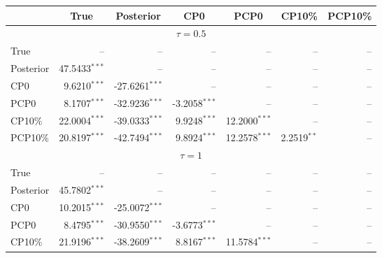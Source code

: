 { \renewcommand{\arraystretch}{1.2} 
 {\footnotesize 
\begin{table} 
\center 
\begin{tabular}{l | rrrrrr} 
& \multicolumn{1}{c}{True}& \multicolumn{1}{c}{Posterior}& \multicolumn{1}{c}{CP0}& \multicolumn{1}{c}{PCP0}& \multicolumn{1}{c}{CP10\%}& \multicolumn{1}{c}{PCP10\%} \\ \hline 
\multicolumn{7}{c}{$\tau = 0.5$} \\ \hline 
True &    --\phantom{$^{***}$} &    --\phantom{$^{***}$} &    --\phantom{$^{***}$} &    --\phantom{$^{***}$} &    --\phantom{$^{***}$} &    --\phantom{$^{***}$}   \\ 
Posterior & 47.5433$^{***}$ &    --\phantom{$^{***}$} &    --\phantom{$^{***}$} &    --\phantom{$^{***}$} &    --\phantom{$^{***}$} &    --\phantom{$^{***}$}   \\ 
CP0 & 9.6210$^{***}$ & -27.6261$^{***}$ &    --\phantom{$^{***}$} &    --\phantom{$^{***}$} &    --\phantom{$^{***}$} &    --\phantom{$^{***}$}   \\ 
PCP0 & 8.1707$^{***}$ & -32.9236$^{***}$ & -3.2058$^{***}$ &    --\phantom{$^{***}$} &    --\phantom{$^{***}$} &    --\phantom{$^{***}$}   \\ 
CP10\% & 22.0004$^{***}$ & -39.0333$^{***}$ & 9.9248$^{***}$ & 12.2000$^{***}$ &    --\phantom{$^{***}$} &    --\phantom{$^{***}$}   \\ 
PCP10\% & 20.8197$^{***}$ & -42.7494$^{***}$ & 9.8924$^{***}$ & 12.2578$^{***}$ & 2.2519$^{**}$\phantom{$^{*}$} &    --\phantom{$^{***}$}   \\ 
\hline 
\multicolumn{7}{c}{$\tau = 1$} \\ \hline 
True &    --\phantom{$^{***}$} &    --\phantom{$^{***}$} &    --\phantom{$^{***}$} &    --\phantom{$^{***}$} &    --\phantom{$^{***}$} &    --\phantom{$^{***}$}   \\ 
Posterior & 45.7802$^{***}$ &    --\phantom{$^{***}$} &    --\phantom{$^{***}$} &    --\phantom{$^{***}$} &    --\phantom{$^{***}$} &    --\phantom{$^{***}$}   \\ 
CP0 & 10.2015$^{***}$ & -25.0072$^{***}$ &    --\phantom{$^{***}$} &    --\phantom{$^{***}$} &    --\phantom{$^{***}$} &    --\phantom{$^{***}$}   \\ 
PCP0 & 8.4795$^{***}$ & -30.9550$^{***}$ & -3.6773$^{***}$ &    --\phantom{$^{***}$} &    --\phantom{$^{***}$} &    --\phantom{$^{***}$}   \\ 
CP10\% & 21.9196$^{***}$ & -38.2609$^{***}$ & 8.8167$^{***}$ & 11.5784$^{***}$ &    --\phantom{$^{***}$} &    --\phantom{$^{***}$}   \\ 

\end{tabular}
\end{table}}}
